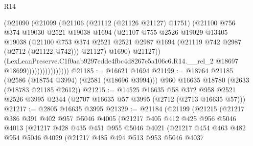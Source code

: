 \begin{lexlean}{R14}
\begin{coremodule}
                              (@21090
                                (@21099
                                  (@21106
                                    (@21112 (@21126 @21127) @1751)
                                    (@21100
                                      @756
                                      @374
                                      @19030
                                      @2521
                                      @19038
                                      @1694
                                      (@21107
                                        @755
                                        @2526
                                        @19029
                                        @13405
                                        @19038
                                        (@21100
                                          @753
                                          @374
                                          @2521
                                          @2521
                                          @2987
                                          @1694
                                          (@21119 @742 @2987 (@2712 (@21122 @742)))
                                          @21127)
                                        @1690)
                                      @21127))
                                  (LexLeanPreserve.C1f0aab9297edde4fbc4d8267e5a106c6.R14.__rel_2
                                    @18697
                                    @18699))))))))))))))))
@21185 := @16621 @1694
@21199 := @18764
    @21185
    (@2586 (@18754 @3994) (@2581 (@18696 @3994)))
    @960
    @16635
    @18780
    (@2633 (@18783 @21185 @2612))
@21215 := @14525
    @16635
    @58
    @372
    @958
    @2521
    @2526
    @3995
    @2344
    (@2707 @16635 @57 @3995 (@2712 (@2713 @16635 @57)))
@21217 := @2805 @16635 @3995
@21329 := @21184
    (@21199
      (@21215
        (@21217
          @386
          @391
          @402
          @957
          @5046
          @4005
          (@21217
            @405
            @412
            @425
            @956
            @5046
            @4013
            (@21217
              @428
              @435
              @451
              @955
              @5046
              @4021
              (@21217
                @454
                @463
                @482
                @954
                @5046
                @4029
                (@21217
                  @485
                  @494
                  @513
                  @953
                  @5046
                  @4037

\end{coremodule}
\end{lexlean}
